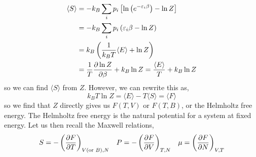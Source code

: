 \documentclass{book}
\begin{document}
\begin{equation}
	\begin{split}
	\langle S \rangle &= -k_B\sum_ip_i\left[\ln\left(e^{-\varepsilon_i\beta}\right)-\ln Z\right]\\
	& = -k_B \sum_ip_i\left(\varepsilon_i\beta - \ln Z\right) \\
	& = k_B \left(\frac{1}{k_B T}\langle E \rangle + \ln Z \right) \\
	& = \frac{1}{T} \pdv{\ln Z}{\beta} + k_B\ln Z = \frac{\left<E\right>}{T} + k_B\ln Z
\end{split}
\end{equation}
so we can find $\langle S \rangle$ from $Z$. However, we can rewrite this as,
\begin{equation}
	k_BT \ln Z = \langle E \rangle - T \langle S \rangle = \langle F \rangle \label{eq:F}
\end{equation}
so we find that $Z$ directly gives us $F(T,V)$ or $F(T,B)$, or the Helmholtz free energy. The Helmholtz free energy is the natural potential for a system at fixed energy. Let us then recall the Maxwell relations,
\begin{align}
	S = -\left(\pdv{F}{T}\right)_{V (\text{or } B), N} && P = -\left(\pdv{F}{V}\right)_{T, N} && \mu = \left(\pdv{F}{N}\right)_{V, T} \label{eq:maxwell}
\end{align}
\end{document}

